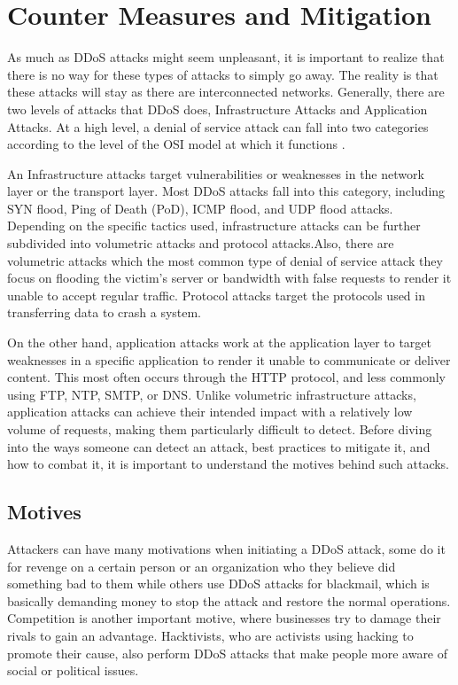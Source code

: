 \documentclass[a4paper, 12pt]{report} %
\begin{document}
                \section{Counter Measures and Mitigation}
                    As much as DDoS attacks might seem unpleasant, it is important to realize that there is no way for these types of attacks to simply go away. The reality is that these attacks will stay as there are interconnected networks. Generally, there are two levels of attacks that DDoS does, Infrastructure Attacks and Application Attacks. At a high level, a denial of service attack can fall into two categories according to the level of the OSI model at which it functions \cite{a10networksDDoSAttack}.
                    
                    An Infrastructure attacks target vulnerabilities or weaknesses in the network layer or the transport layer. Most DDoS attacks fall into this category, including SYN flood, Ping of Death (PoD), ICMP flood, and UDP flood attacks. Depending on the specific tactics used, infrastructure attacks can be further subdivided into volumetric attacks and protocol attacks.Also, there are volumetric attacks which the most common type of denial of service attack they focus on flooding the victim’s server or bandwidth with false requests to render it unable to accept regular traffic. Protocol attacks target the protocols used in transferring data to crash a system.

                    On the other hand, application attacks work at the application layer to target weaknesses in a specific application to render it unable to communicate or deliver content. This most often occurs through the HTTP protocol, and less commonly using FTP, NTP, SMTP, or DNS. Unlike volumetric infrastructure attacks, application attacks can achieve their intended impact with a relatively low volume of requests, making them particularly difficult to detect. 
                    Before diving into the ways someone can detect an attack, best practices to mitigate it, and how to combat it, it is important to understand the motives behind such attacks. 

                    \subsection{Motives}
                    Attackers can have many motivations when initiating a DDoS attack, some do it for revenge on a certain person or an organization who they believe did something bad to them while others use DDoS attacks for blackmail, which is basically demanding money to stop the attack and restore the normal operations. Competition is another important motive, where businesses try to damage their rivals to gain an advantage. Hacktivists, who are activists using hacking to promote their cause, also perform DDoS attacks that make people more aware of social or political issues.
                    
\end{document}
